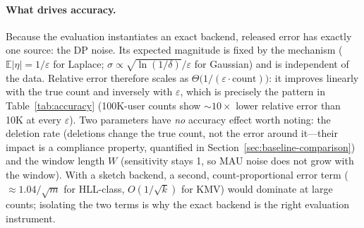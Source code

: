 \documentclass[sigconf,anonymous,review]{acmart}
\begin{document}
\begin{table}[H]
    \centering
    \caption{Accuracy metrics: relative error (\%) at various $\varepsilon$}
    \label{tab:accuracy}
\end{table}

\paragraph{What drives accuracy.} Because the evaluation instantiates an exact backend, released error has exactly one source: the DP noise. Its expected magnitude is fixed by the mechanism ($\mathbb{E}|\eta| = 1/\varepsilon$ for Laplace; $\sigma \propto \sqrt{\ln(1/\delta)}/\varepsilon$ for Gaussian) and is independent of the data. Relative error therefore scales as $\Theta\!\bigl(1/(\varepsilon \cdot \text{count})\bigr)$: it improves linearly with the true count and inversely with $\varepsilon$, which is precisely the pattern in Table~\ref{tab:accuracy} (100K-user counts show ${\sim}10\times$ lower relative error than 10K at every $\varepsilon$). Two parameters have \emph{no} accuracy effect worth noting: the deletion rate (deletions change the true count, not the error around it---their impact is a compliance property, quantified in Section~\ref{sec:baseline-comparison}) and the window length $W$ (sensitivity stays 1, so MAU noise does not grow with the window). With a sketch backend, a second, count-proportional error term ($\approx 1.04/\sqrt{m}$ for HLL-class, $O(1/\sqrt{k})$ for KMV) would dominate at large counts; isolating the two terms is why the exact backend is the right evaluation instrument.
\end{document}
